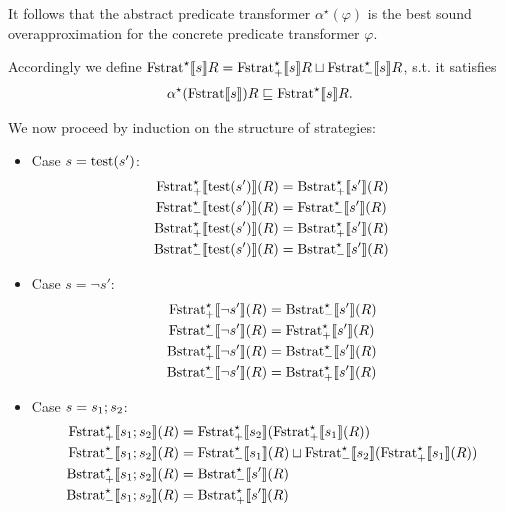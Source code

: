 \documentclass{article}
\newcommand{\seq}[2]{\ensuremath #1 ; #2}
\newcommand{\test}[1]{\ensuremath \text{test}(#1)}
\newcommand{\Fstrat}[1]{\ensuremath \text{Fstrat}\llbracket #1 \rrbracket}
\newcommand{\Fstrata}[1]{\ensuremath \text{Fstrat}^\star\llbracket #1 \rrbracket}
\newcommand{\Fstratam}[1]{\ensuremath \text{Fstrat}^\star_{-}\llbracket #1 \rrbracket}
\newcommand{\Fstratap}[1]{\ensuremath \text{Fstrat}^\star_{+}\llbracket #1 \rrbracket}
\newcommand{\Bstratap}[1]{\ensuremath \text{Bstrat}_{+}^\star\llbracket #1 \rrbracket}
\newcommand{\Bstratam}[1]{\ensuremath \text{Bstrat}_{-}^\star\llbracket #1 \rrbracket}
\begin{document}
It follows that the abstract predicate transformer $\alpha^\star(\varphi)$ is the best sound overapproximation for the concrete predicate transformer $\varphi$.

Accordingly we define $\Fstrata{s}R = \Fstratap{s}R \sqcup \Fstratam{s}R$, s.t. it satisfies
\begin{align*}
  \alpha^\star(\Fstrat{s})R \sqsubseteq \Fstrata{s}R.
\end{align*}

We now proceed by induction on the structure of strategies: 
\begin{itemize}
\item Case $s = \test{s'}$:
  \begin{align*}
    \Fstratap{\test{s'}}(R) &= \Bstratap{s'}(R) \\
    \Fstratam{\test{s'}}(R) &= \Fstratam{s'}(R) \\
    \Bstratap{\test{s'}}(R) &= \Bstratap{s'}(R) \\
    \Bstratam{\test{s'}}(R) &= \Bstratam{s'}(R) \\
  \end{align*}
\item Case $s = \neg{s'}$:
  \begin{align*}
    \Fstratap{\neg{s'}}(R) &= \Bstratam{s'}(R) \\
    \Fstratam{\neg{s'}}(R) &= \Fstratap{s'}(R) \\
    \Bstratap{\neg{s'}}(R) &= \Bstratam{s'}(R) \\
    \Bstratam{\neg{s'}}(R) &= \Bstratap{s'}(R) \\
  \end{align*}

\item Case $s = \seq{s_1}{s_2}$:
  \begin{align*}
    \Fstratap{\seq{s_1}{s_2}}(R) &= \Fstratap{s_2}(\Fstratap{s_1}(R)) \\
    \Fstratam{\seq{s_1}{s_2}}(R) &= \Fstratam{s_1}(R) \sqcup \Fstratam{s_2}(\Fstratap{s_1}(R)) \\
    \Bstratap{\seq{s_1}{s_2}}(R) &= \Bstratam{s'}(R) \\
    \Bstratam{\seq{s_1}{s_2}}(R) &= \Bstratap{s'}(R) \\
  \end{align*}
  
\end{itemize}
\end{document}

